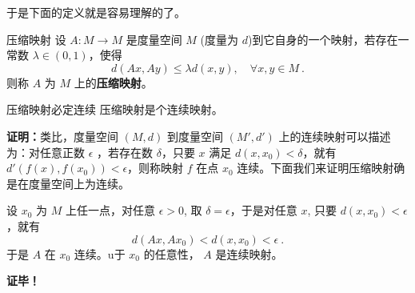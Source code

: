 于是下面的定义就是容易理解的了。
\begin{definition}{压缩映射}
设 $A:M\rightarrow M$ 是度量空间 $M$ (度量为 $d$)到它自身的一个映射，若存在一常数 $\lambda\in(0,1)$，使得
\begin{equation}
d(Ax,Ay)\leq \lambda d(x,y),\quad \forall x,y\in M~.
\end{equation}
 则称 $A$ 为 $M$ 上的\textbf{压缩映射}。
\end{definition}
\begin{theorem}{压缩映射必定连续}
压缩映射是个连续映射。
\end{theorem}
\textbf{证明：}类比，度量空间 $(M,d)$ 到度量空间 $(M',d')$ 上的连续映射可以描述为：对任意正数 $\epsilon$ ，若存在数 $\delta$，只要 $x$ 满足 $d(x,x_0)<\delta$，就有 $d'(f(x),f(x_0))<\epsilon$，则称映射 $f$ 在点 $x_0$ 连续。下面我们来证明压缩映射确是在度量空间上为连续。

设 $x_0$ 为 $M$ 上任一点，对任意 $\epsilon>0$, 取 $\delta=\epsilon$，于是对任意 $x$, 只要 $d(x,x_0)<\epsilon$，就有
\begin{equation}
d(A x,A x_0)<d(x,x_0)<\epsilon~.
\end{equation}
于是 $A$ 在 $x_0$ 连续。u于 $x_0$ 的任意性， $A$ 是连续映射。



\textbf{证毕！}